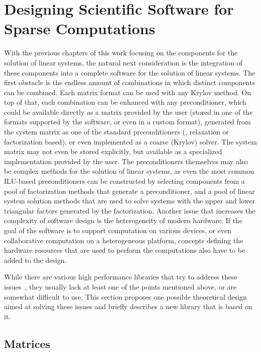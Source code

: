 \section{Designing Scientific Software for Sparse Computations}

With the previous chapters of this work focusing on the components for the
solution of linear systems, the natural next consideration is the integration of
these components into a complete software for the solution of linear systems.
The first obstacle is the endless amount of combinations in which distinct
components can be combined. Each matrix format can be used with any Krylov
method. On top of that, each combination can be enhanced with any
preconditioner, which could be available directly as a matrix provided by the
user (stored in one of the formats supported by the software, or even in a
custom format), generated from the system matrix as one of the standard
preconditioners (\eg, relaxation or factorization based), or even implemented as
a coarse (Krylov) solver. The system matrix may not even be stored explicitly,
but available as a specialized implementation provided by the user. The
preconditioners themselves may also be complex methods for the solution of
linear systems, as even the most common ILU-based preconditioners can be
constructed by selecting components from a pool of factorization methods that
generate a preconditioner, and a pool of linear system solution methods that are
used to solve systems with the upper and lower triangular factors generated by
the factorization. Another issue that increases the complexity of software
design is the heterogeneity of modern hardware. If the goal of the software is
to support computation on various devices, or even collaborative computation on
a heterogeneous platform, concepts defining the hardware resources that are used
to perform the computations also have to be added to the design.

While there are various high performance libraries that try to address these
issues~\cite{magma,vienna-cl,paralution}, they usually lack at least one of the
points mentioned above, or are somewhat difficult to use. This section proposes
one possible theoretical design aimed at solving these issues and briefly
describes a new library that is based on it.

\subsection{Matrices}
\label{conclusion:ssec:matrices}

